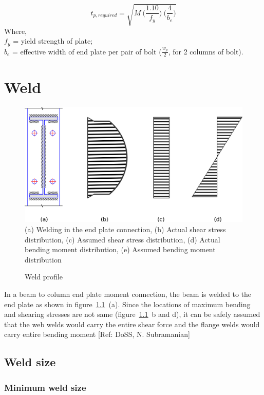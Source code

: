 \documentclass[11.5pt,a4paper,oneside]{report}
\begin{document}
\begin{Form}
	\begin{equation}
		t_{p,required} = \sqrt{M~ \bigg(\frac{1.10}{f_y}\bigg) ~ \bigg(\frac{4}{b_e}\bigg)}
	\end{equation}
	Where, \\
\indent $f_y$ = yield strength of plate; \\
\indent $b_e$ = effective width of end plate per pair of bolt ($\frac{w_p}{2}$, for 2 columns of bolt).


\chapter{Weld}

\begin{figure}[h]
	\centering
	\includegraphics[width=0.7\linewidth]{weld_stress.png} \\
	{(a) Welding in the end plate connection, (b) Actual shear stress distribution, (c) Assumed shear stress distribution, (d) Actual bending moment distribution, (e) Assumed bending moment distribution}
	\caption[Weld stress]{Weld profile}
	\label{fig:weld_stress}
\end{figure}

In a beam to column end plate moment connection, the beam is welded to the end plate as shown in figure~\ref{fig:weld_stress}~(a). Since the locations of maximum bending and shearing stresses are not same (figure~\ref{fig:weld_stress}~b and d), it can be safely assumed that the web welds would carry the entire shear force and the flange welds would carry entire bending moment [Ref: DoSS, N. Subramanian] 

\section{Weld size}

\subsection{Minimum weld size}
\quad {} \\


\end{Form}
\end{document}
